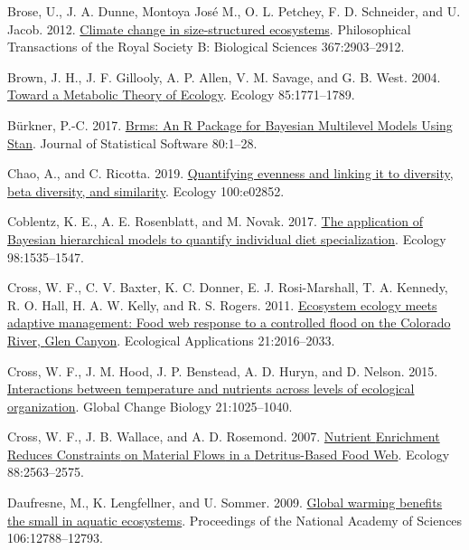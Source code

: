 \documentclass[
]{article}
\newlength{\cslhangindent}
\newlength{\cslentryspacingunit} %
\newenvironment{CSLReferences}[2] %
 {%
  \setlength{\parindent}{0pt}
  \ifodd #1
  \let\oldpar\par
  \def\par{\hangindent=\cslhangindent\oldpar}
  \fi
  \setlength{\parskip}{#2\cslentryspacingunit}
 }%
 {}
\numberwithin{equation}
\begin{document}
\begin{CSLReferences}{1}{0}
\leavevmode{}%
Brose, U., J. A. Dunne, Montoya José M., O. L. Petchey, F. D. Schneider,
and U. Jacob. 2012.
\href{https://doi.org/10.1098/rstb.2012.0232}{Climate change in
size-structured ecosystems}. Philosophical Transactions of the Royal
Society B: Biological Sciences 367:2903--2912.

\leavevmode{}%
Brown, J. H., J. F. Gillooly, A. P. Allen, V. M. Savage, and G. B. West.
2004. \href{https://doi.org/10.1890/03-9000}{Toward a {Metabolic Theory}
of {Ecology}}. Ecology 85:1771--1789.

\leavevmode{}%
Bürkner, P.-C. 2017. \href{https://doi.org/10.18637/jss.v080.i01}{Brms:
{An R Package} for {Bayesian Multilevel Models Using Stan}}. Journal of
Statistical Software 80:1--28.

\leavevmode{}%
Chao, A., and C. Ricotta. 2019.
\href{https://doi.org/10.1002/ecy.2852}{Quantifying evenness and linking
it to diversity, beta diversity, and similarity}. Ecology 100:e02852.

\leavevmode{}%
Coblentz, K. E., A. E. Rosenblatt, and M. Novak. 2017.
\href{https://doi.org/10.1002/ecy.1802}{The application of {Bayesian}
hierarchical models to quantify individual diet specialization}. Ecology
98:1535--1547.

\leavevmode{}%
Cross, W. F., C. V. Baxter, K. C. Donner, E. J. Rosi-Marshall, T. A.
Kennedy, R. O. Hall, H. A. W. Kelly, and R. S. Rogers. 2011.
\href{https://doi.org/10.1890/10-1719.1}{Ecosystem ecology meets
adaptive management: Food web response to a controlled flood on the
{Colorado River}, {Glen Canyon}}. Ecological Applications 21:2016--2033.

\leavevmode{}%
Cross, W. F., J. M. Hood, J. P. Benstead, A. D. Huryn, and D. Nelson.
2015. \href{https://doi.org/10.1111/gcb.12809}{Interactions between
temperature and nutrients across levels of ecological organization}.
Global Change Biology 21:1025--1040.

\leavevmode{}%
Cross, W. F., J. B. Wallace, and A. D. Rosemond. 2007.
\href{https://doi.org/10.1890/06-1348.1}{Nutrient {Enrichment Reduces
Constraints} on {Material Flows} in a {Detritus-Based Food Web}}.
Ecology 88:2563--2575.

\leavevmode{}%
Daufresne, M., K. Lengfellner, and U. Sommer. 2009.
\href{https://doi.org/10.1073/pnas.0902080106}{Global warming benefits
the small in aquatic ecosystems}. Proceedings of the National Academy of
Sciences 106:12788--12793.


\end{CSLReferences}
\end{document}
